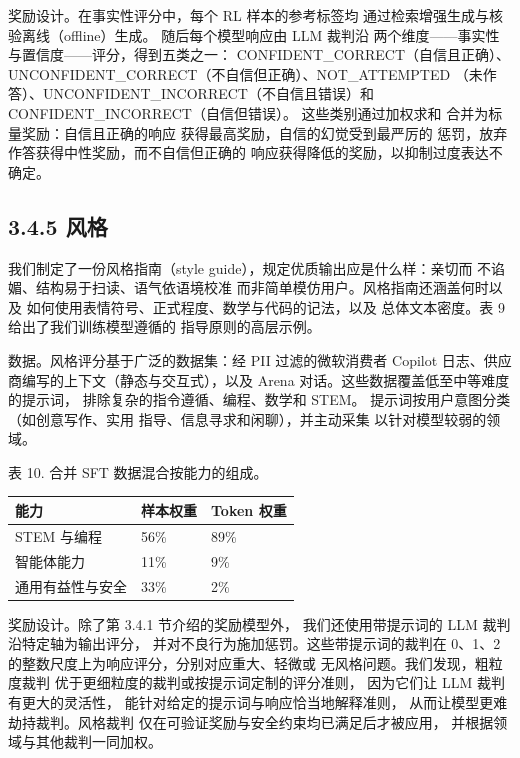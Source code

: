 奖励设计。在事实性评分中，每个 RL 样本的参考标签均
通过检索增强生成与核验离线（offline）生成。
随后每个模型响应由 LLM 裁判沿
两个维度——事实性与置信度——评分，得到五类之一：
CONFIDENT\_CORRECT（自信且正确）、UNCONFIDENT\_CORRECT（不自信但正确）、NOT\_ATTEMPTED
（未作答）、UNCONFIDENT\_INCORRECT（不自信且错误）和 CONFIDENT\_INCORRECT（自信但错误）。
这些类别通过加权求和
合并为标量奖励：自信且正确的响应
获得最高奖励，自信的幻觉受到最严厉的
惩罚，放弃作答获得中性奖励，而不自信但正确的
响应获得降低的奖励，以抑制过度表达不确定。

\subsection{3.4.5 风格}\label{style}

我们制定了一份风格指南（style guide），规定优质输出应是什么样：亲切而
不谄媚、结构易于扫读、语气依语境校准
而非简单模仿用户。风格指南还涵盖何时以及
如何使用表情符号、正式程度、数学与代码的记法，以及
总体文本密度。表 9 给出了我们训练模型遵循的
指导原则的高层示例。

数据。风格评分基于广泛的数据集：经 PII 过滤的微软消费者
Copilot 日志、供应商编写的上下文（静态与交互式），以及
Arena 对话。这些数据覆盖低至中等难度的提示词，
排除复杂的指令遵循、编程、数学和 STEM。
提示词按用户意图分类（如创意写作、实用
指导、信息寻求和闲聊），并主动采集
以针对模型较弱的领域。



表 10. 合并 SFT 数据混合按能力的组成。

{\def\LTcaptype{none} %
\begin{longtable}[]{@{}|l|l|l|@{}}
\toprule\noalign{}
\endhead
\bottomrule\noalign{}
\endlastfoot
\hline
能力 & 样本权重 & Token 权重 \\
\hline
STEM 与编程 & 56\% & 89\% \\
\hline
智能体能力 & 11\% & 9\% \\
\hline
通用有益性与安全 & 33\% & 2\% \\
\hline
\end{longtable}
}

奖励设计。除了第 3.4.1 节介绍的奖励模型外，
我们还使用带提示词的 LLM 裁判沿特定轴为输出评分，
并对不良行为施加惩罚。这些带提示词的裁判在
0、1、2 的整数尺度上为响应评分，分别对应重大、轻微或
无风格问题。我们发现，粗粒度裁判
优于更细粒度的裁判或按提示词定制的评分准则，
因为它们让 LLM 裁判有更大的灵活性，
能针对给定的提示词与响应恰当地解释准则，
从而让模型更难劫持裁判。风格裁判
仅在可验证奖励与安全约束均已满足后才被应用，
并根据领域与其他裁判一同加权。
